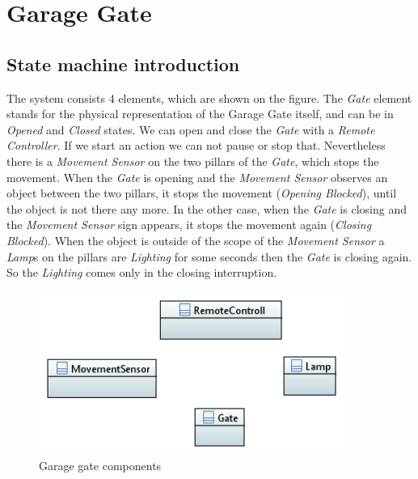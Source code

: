 \chapter{Garage Gate}\label{sect:garage-gate-model}
\section{State machine introduction}

The system consists  4 elements, which are shown on the  figure. The \textit{Gate} element stands for the physical representation of the Garage Gate itself, and can be in \textit{Opened} and \textit{Closed} states. We can open and close the \textit{Gate} with a \textit{Remote Controller}. If we start an action we can not pause or stop that. Nevertheless there is a \textit{Movement Sensor} on the two pillars of the \textit{Gate}, which stops the movement. When the \textit{Gate} is opening and the \textit{Movement Sensor} observes an object between the two pillars, it stops the movement (\textit{Opening Blocked}), until the object is not there any more. In the other case, when the \textit{Gate} is closing and the \textit{Movement Sensor} sign appears, it stops the movement again (\textit{Closing Blocked}). When the object is outside of the scope of the \textit{Movement Sensor} a \textit{Lamp}s on the pillars are \textit{Lighting} for some seconds then the \textit{Gate} is closing again.
So the \textit{Lighting} comes only in the closing interruption.

\begin{figure}[!ht]
	\centering
	\includegraphics[width=100mm, keepaspectratio]{figures/component.png}
	\caption{Garage gate components}
	\label{fig:Garage Component}
\end{figure}

